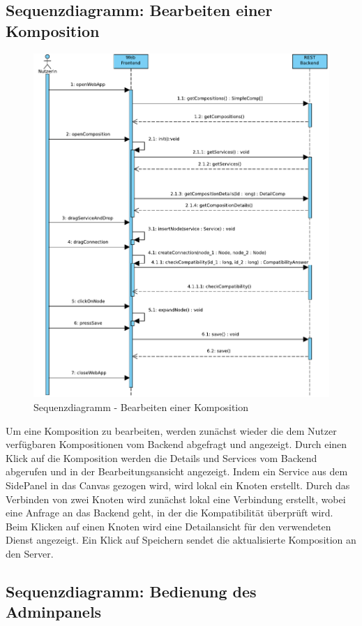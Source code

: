\subsection*{Sequenzdiagramm: Bearbeiten einer Komposition}

\begin{figure}[h]
	\centering
	\includegraphics[width=.75\textwidth]{img/Diagramme/Sequenz/Frontend_editComp}			
	\caption{Sequenzdiagramm - Bearbeiten einer Komposition}
	\label{fig:sequenz-editComp}
\end{figure}
\noindent
Um eine Komposition zu bearbeiten, werden zunächst wieder die dem Nutzer verfügbaren Kompositionen vom Backend abgefragt und angezeigt. Durch einen Klick auf die Komposition werden die Details und Services vom Backend abgerufen und in der Bearbeitungsansicht angezeigt. Indem ein Service aus dem SidePanel in das Canvas gezogen wird, wird lokal ein Knoten erstellt. Durch das Verbinden von zwei Knoten wird zunächst lokal eine Verbindung erstellt, wobei eine Anfrage an das Backend geht, in der die Kompatibilität überprüft wird. Beim Klicken auf einen Knoten wird eine Detailansicht für den verwendeten Dienst angezeigt. Ein Klick auf Speichern sendet die aktualisierte Komposition an den Server.

\subsection*{Sequenzdiagramm: Bedienung des Adminpanels}


